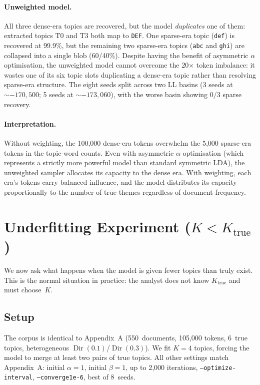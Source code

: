 \documentclass[11pt]{article}
\begin{document}
\paragraph{Unweighted model.}
All three dense-era topics are recovered, but the model \emph{duplicates} one of them: extracted topics T0 and T3 both map to \texttt{DEF}.
One sparse-era topic (\texttt{def}) is recovered at 99.9\%, but the remaining two sparse-era topics (\texttt{abc} and \texttt{ghi}) are collapsed into a single blob (60/40\%).
Despite having the benefit of asymmetric $\alpha$ optimisation, the unweighted model cannot overcome the 20$\times$ token imbalance: it wastes one of its six topic slots duplicating a dense-era topic rather than resolving sparse-era structure.
The eight seeds split across two LL basins (3 seeds at ${\sim}{-}170{,}500$; 5 seeds at ${\sim}{-}173{,}060$), with the worse basin showing 0/3 sparse recovery.

\paragraph{Interpretation.}
Without weighting, the 100{,}000 dense-era tokens overwhelm the 5{,}000 sparse-era tokens in the topic-word counts.
Even with asymmetric $\alpha$ optimisation (which represents a strictly more powerful model than standard symmetric LDA), the unweighted sampler allocates its capacity to the dense era.
With weighting, each era's tokens carry balanced influence, and the model distributes its capacity proportionally to the number of true themes regardless of document frequency.

\section{Underfitting Experiment ($K < K_{\text{true}}$)}

We now ask what happens when the model is given fewer topics than truly exist.
This is the normal situation in practice: the analyst does not know $K_{\text{true}}$ and must choose~$K$.

\subsection{Setup}

The corpus is identical to Appendix~A (550~documents, 105{,}000 tokens, 6~true topics, heterogeneous $\operatorname{Dir}(0.1)$/$\operatorname{Dir}(0.3)$).
We fit $K=4$ topics, forcing the model to merge at least two pairs of true topics.
All other settings match Appendix~A: initial $\alpha=1$, initial $\beta=1$, up to 2{,}000 iterations, \texttt{--optimize-interval}, \texttt{--converge\;1e-6}, best of 8~seeds.
\end{document}
